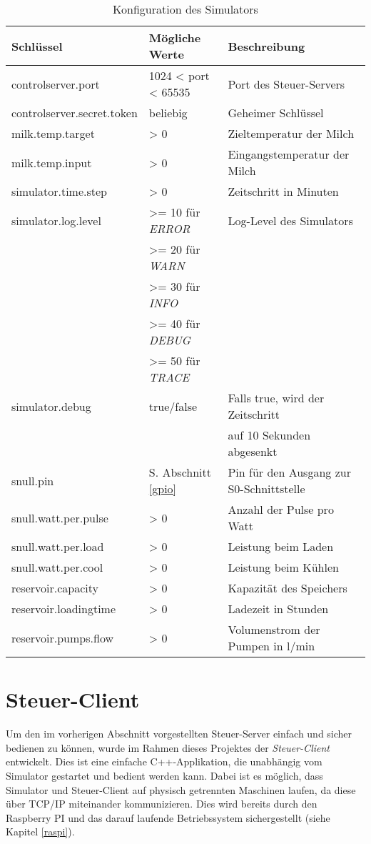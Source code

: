 \begin{table}[H]
\centering
\begin{tabularx}{\textwidth}{|p{}|p{}|X|}
\hline
\textbf{Schlüssel} & \textbf{Mögliche Werte} & \textbf{Beschreibung} \\ \hline
controlserver.port & 1024 < port < 65535 & Port des Steuer-Servers \\ \hline
controlserver.secret.token & beliebig & Geheimer Schlüssel \\ \hline
milk.temp.target & > 0 & Zieltemperatur der Milch \\ \hline
milk.temp.input & > 0 & Eingangstemperatur der Milch \\ \hline
simulator.time.step & > 0 & Zeitschritt in Minuten \\ \hline
simulator.log.level & >= 10 für \emph{ERROR} & Log-Level des Simulators \\
 & >= 20 für \emph{WARN} & \\ 
 & >= 30 für \emph{INFO} & \\
 & >= 40 für \emph{DEBUG} & \\ 
 & >= 50 für \emph{TRACE} & \\ \hline
simulator.debug & true/false & Falls true, wird der Zeitschritt \\
 & & auf 10 Sekunden abgesenkt \\ \hline
snull.pin & S. Abschnitt \ref{gpio} & Pin für den Ausgang zur S0-Schnittstelle \\ \hline
snull.watt.per.pulse & > 0 & Anzahl der Pulse pro Watt \\ \hline
snull.watt.per.load & > 0 & Leistung beim Laden \\ \hline
snull.watt.per.cool & > 0 & Leistung beim Kühlen \\ \hline
reservoir.capacity & > 0 & Kapazität des Speichers \\ \hline
reservoir.loadingtime & > 0 & Ladezeit in Stunden \\ \hline
reservoir.pumps.flow & > 0 & Volumenstrom der Pumpen in l/min \\ \hline
\end{tabularx}
\caption{Konfiguration des Simulators}
\label{tab:simulatorconfig}
\end{table}

\section{Steuer-Client}\label{steuerclient}
Um den im vorherigen Abschnitt vorgestellten Steuer-Server einfach und sicher bedienen zu können, wurde im Rahmen dieses Projektes der \emph{Steuer-Client} entwickelt. Dies ist eine einfache C++-Applikation, die unabhängig vom Simulator gestartet und bedient werden kann. Dabei ist es möglich, dass Simulator und Steuer-Client auf physisch getrennten Maschinen laufen, da diese über TCP/IP miteinander kommunizieren. Dies wird bereits durch den Raspberry PI und das darauf laufende Betriebssystem sichergestellt (siehe Kapitel \ref{raspi}).

